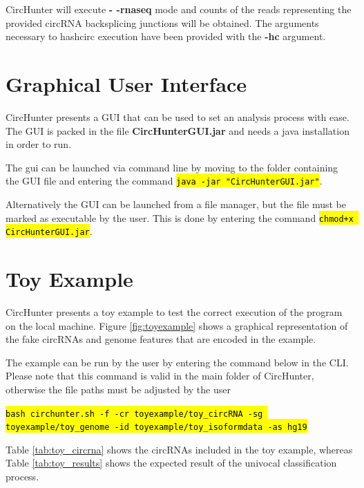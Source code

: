 \documentclass[letterpaper,12pt]{article}
\newcommand{\code}[1]{\hl{\texttt{#1}}}
\begin{document}
CircHunter will execute \textbf{- -rnaseq} mode and counts of the reads representing the provided circRNA backsplicing junctions will be obtained. The arguments necessary to hashcirc execution have been provided with the \textbf{-hc} argument.

\section{Graphical User Interface}
CircHunter presents a GUI that can be used to set an analysis process with ease. The GUI is packed in the file \textbf{CircHunterGUI.jar} and needs a java installation in order to run.

\bigskip

The gui can be launched via command line by moving to the folder containing the GUI file and entering the command \code{java -jar "CircHunterGUI.jar"}.

Alternatively the GUI can be launched from a file manager, but the file must be marked as executable by the user. This is done by entering the command \code{chmod+x CircHunterGUI.jar}.

\section{Toy Example}

CircHunter presents a toy example to test the correct execution of the program on the local machine. Figure \ref{fig:toyexample} shows a graphical representation of the fake circRNAs and genome features that are encoded in the example.

The example can be run by the user by entering the command below in the CLI. Please note that this command is valid in the main folder of CircHunter, otherwise the file paths must be adjusted by the user

\bigskip

\noindent\code{bash circhunter.sh -f -cr toyexample/toy\_circRNA -sg toyexample/toy\_genome -id toyexample/toy\_isoformdata -as hg19}

\bigskip

Table \ref{tab:toy_circrna} shows the circRNAs included in the toy example, whereas Table \ref{tab:toy_results} shows the expected result of the univocal classification process.
\end{document}
